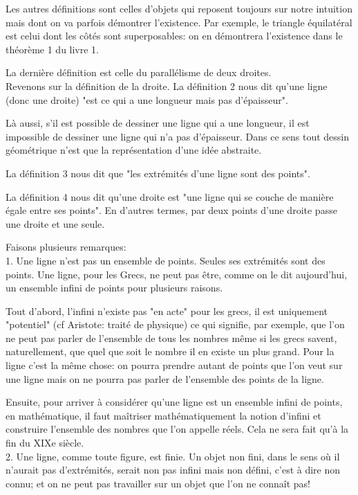 \documentclass[a4paper, 12pt, twoside]{book}
\begin{document}
  Les autres définitions sont celles d'objets qui reposent toujours sur notre intuition mais dont on va parfois démontrer l'existence. Par exemple, le triangle équilatéral est celui dont les côtés sont superposables: on en démontrera l'existence dans le théorème 1 du livre 1.

     
  La dernière définition est celle du parallélisme de deux droites.\\
  

  Revenons sur la définition de la droite. La définition 2 nous dit qu'une ligne (donc une droite) "est ce qui a une longueur mais pas d'épaisseur".\bigskip
  
  Là aussi, s'il est possible de dessiner une ligne qui a une longueur, il est impossible de dessiner une ligne qui n'a pas d'épaisseur. Dans ce sens tout dessin géométrique n'est que la représentation d'une idée abstraite.\
   
  
    La définition 3 nous dit que "les extrémités d'une ligne sont des points".\bigskip 
    
   La définition 4 nous dit qu'une droite est "une ligne qui se couche de manière égale entre ses points". En d'autres termes, par deux points d'une droite passe une droite et une seule.\
   
   Faisons plusieurs remarques:\\ 
   
1. Une ligne n'est pas un ensemble de points. Seules ses extrémités sont des points. Une ligne, pour les Grecs, ne peut pas être, comme on le dit aujourd'hui, un ensemble infini de points pour plusieurs raisons. \

Tout d'abord, l'infini n'existe pas "en acte" pour les grecs, il est uniquement "potentiel" (cf Aristote: traité de physique) ce qui signifie, par exemple, que  l'on ne peut pas parler de l'ensemble de tous les nombres même si les grecs savent, naturellement, que quel que soit le nombre il en existe un plus grand. Pour la ligne c'est la même chose: on pourra prendre autant de points que l'on veut sur une ligne mais on ne pourra pas parler de l'ensemble des points de la ligne.\

Ensuite, pour arriver à considérer qu'une ligne est un ensemble infini de points, en mathématique,  il faut maîtriser mathématiquement la notion d'infini et construire l'ensemble des nombres que l'on appelle réels. Cela ne sera fait qu'à la fin du XIXe siècle.\\


2. Une ligne, comme toute figure, est finie. Un objet non fini, dans le sens où il n'aurait pas d'extrémités, serait non pas infini mais non défini, c'est à dire non connu; et on ne peut pas travailler sur un objet que l'on ne connaît pas!\bigskip 
\end{document}
